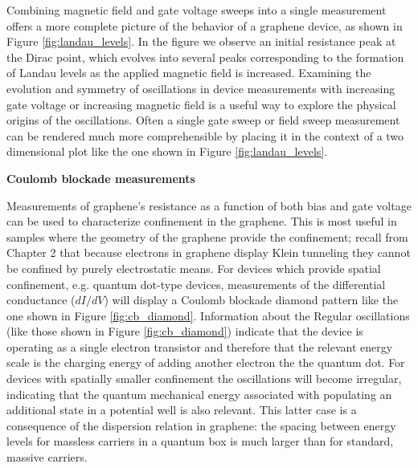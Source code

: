 \documentclass[edeposit,fullpage,draftthesis]{uiucthesis2009}
\begin{document}
            Combining magnetic field and gate voltage sweeps into a single measurement offers a more complete picture
            of the behavior of a graphene device, as shown in Figure \ref{fig:landau_levels}. 
            In the figure we observe an initial resistance peak at the Dirac point, which evolves into several
            peaks corresponding to the formation of Landau levels as the applied magnetic field is increased.
            Examining the evolution and symmetry of oscillations in device measurements with increasing
            gate voltage or increasing magnetic field is a useful way to explore the physical origins of the oscillations.
            Often a single gate sweep or field sweep measurement can be rendered much more comprehensible by
            placing it in the context of a two dimensional plot like the one shown in Figure \ref{fig:landau_levels}.
            
           
            \textbf{Coulomb blockade measurements}
            
            Measurements of graphene's resistance as a function of both bias and gate voltage can be used to
            characterize confinement in the graphene. This is most useful in samples where the geometry
            of the graphene provide the confinement; recall from Chapter 2 that because electrons in graphene
            display Klein tunneling they cannot be confined by purely electrostatic means.
            For devices which provide spatial confinement, e.g. quantum dot-type devices, measurements
            of the differential conductance ($dI/dV$) will display a Coulomb blockade diamond pattern
            like the one shown in Figure \ref{fig:cb_diamond}. Information about the 
            Regular oscillations (like those shown in Figure \ref{fig:cb_diamond}) indicate that the device
            is operating as a single electron transistor
            and therefore that the relevant energy scale is the charging energy of adding another electron the the quantum dot.
            For devices with spatially smaller confinement the oscillations will become irregular, indicating 
            that the quantum mechanical energy associated with populating an additional state in a potential well
            is also relevant. This latter case is a consequence of the dispersion relation in graphene: the spacing
            between energy levels for massless carriers in a quantum box is much larger than for standard, massive carriers.
            
\end{document}
